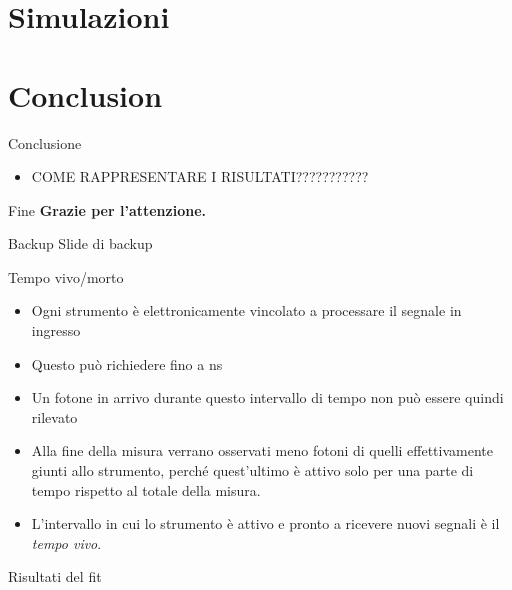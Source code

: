\documentclass [xcolor=svgnames] {beamer}
\begin{document}
\section{Simulazioni}

	
	\section{Conclusion}
	\begin{frame}{Conclusione}
		\begin{itemize}
			\item COME RAPPRESENTARE I RISULTATI???????????
		\end{itemize}
	\end{frame}
	
	\begin{frame}{Fine}
		\centering
		\textbf{Grazie per l'attenzione.}
	\end{frame}
	
\begin{frame}{Backup}
	\centering
	Slide di backup
\end{frame}


\begin{frame}{Tempo vivo/morto}
	\begin{itemize}
		\item Ogni strumento è elettronicamente vincolato a processare il segnale in ingresso
		\item Questo può richiedere fino a ns
		\item Un fotone in arrivo durante questo intervallo di tempo non può essere quindi rilevato
		\item Alla fine della misura verrano osservati meno fotoni di quelli effettivamente giunti allo strumento, perché quest'ultimo è attivo solo per una parte di tempo rispetto al totale della misura.
		\item L'intervallo in cui lo strumento è attivo e pronto a ricevere nuovi segnali è il \emph{tempo vivo}.
	\end{itemize}
\end{frame}
\begin{frame}{Risultati del fit}
	\begin{table}[ht]
		\centering
	\end{table}
\end{frame}	
\end{document}

